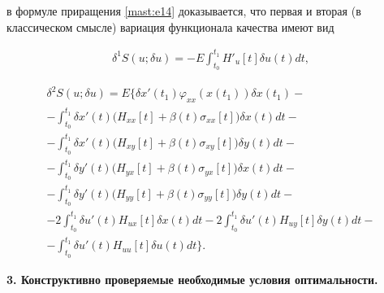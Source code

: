 в формуле приращения \eqref{mast:e14}   доказывается, что первая и вторая (в классическом смысле) вариация функционала качества имеют вид

\begin{gather}

  \label{mast:e20}

\delta^{1} S(u; \delta u)=-E \int^{t_{1}}_{t_{0}} H'_{u}[t] \delta u(t)dt,

 \end{gather}

\begin{multline}

  \label{mast:e21}

\delta^{2} S(u; \delta u)=E \biggl\{  

\delta x'(t_{1}) \varphi_{xx}(x(t_{1})) \delta x(t_{1}) -

\\ 

-\int^{t_{1}}_{t_{0}} \delta x'(t)\bigl( H_{xx}[t] +\beta (t) \sigma_{xx}[t]\bigr) \delta x(t)dt- 

\\ 

- \int^{t_{1}}_{t_{0}} \delta x'(t)\bigl( H_{xy}[t] +\beta (t) \sigma_{xy}[t]\bigr) \delta y(t)dt-

\\

- \int^{t_{1}}_{t_{0}} \delta y'(t)\bigl( H_{yx}[t] +\beta (t) \sigma_{yx}[t]\bigr) \delta x(t)dt- 

\\ 

- \int^{t_{1}}_{t_{0}} \delta y'(t)\bigl( H_{yy}[t] +\beta (t) \sigma_{yy}[t]\bigr) \delta y(t)dt-

\\

- 

2\int^{t_{1}}_{t_{0}} \delta u'(t)H_{ux}[t] \delta x(t)dt-

2 \int^{t_{1}}_{t_{0}} \delta u'(t)H_{uy}[t] \delta y(t)dt - \\ 

-\int^{t_{1}}_{t_{0}} \delta u'(t)H_{uu}[t] \delta u(t)dt\biggr\}  . 

 \end{multline}

 

\smallskip 



\textbf{3. Конструктивно проверяемые необходимые условия оптимальности.} 


